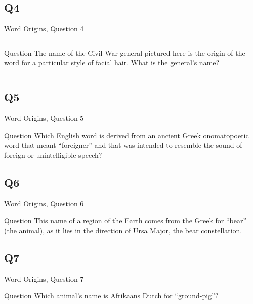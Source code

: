 \documentclass[11pt]{beamer}
\begin{document}
\subsection*{Q4}
\begin{frame}[t]{Word Origins, Question 4}
\begin{columns}[T,totalwidth=\linewidth]
\begin{column}{0.32\linewidth}
\begin{block}{Question}
The name of the Civil War general pictured here is the origin of the word for a particular style of facial hair. What is the general's name?
\end{block}
\end{column}
\begin{column}{0.65\linewidth}
\begin{center}
\texttt{[image: \{Images/burnsides]}.jpg}
\end{center}
\end{column}
\end{columns}
\end{frame}
\subsection*{Q5}
\begin{frame}[t]{Word Origins, Question 5}
\begin{block}{Question}
Which English word is derived from an ancient Greek onomatopoetic word that meant ``foreigner'' and that was intended to resemble the sound of foreign or unintelligible speech?
\end{block}
\end{frame}
\subsection*{Q6}
\begin{frame}[t]{Word Origins, Question 6}
\begin{block}{Question}
This name of a region of the Earth comes from the Greek for ``bear'' (the animal), as it lies in the direction of Ursa Major, the bear constellation.
\end{block}
\end{frame}
\subsection*{Q7}
\begin{frame}[t]{Word Origins, Question 7}
\begin{block}{Question}
Which animal's name is Afrikaans Dutch for ``ground-pig''?
\end{block}
\end{frame}
\end{document}
